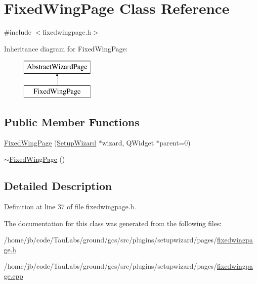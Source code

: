 \hypertarget{class_fixed_wing_page}{\section{\-Fixed\-Wing\-Page \-Class \-Reference}
\label{class_fixed_wing_page}
}


{\ttfamily \#include $<$fixedwingpage.\-h$>$}

\-Inheritance diagram for \-Fixed\-Wing\-Page\-:\begin{figure}[H]
\begin{center}
\leavevmode
\includegraphics[height=2.000000cm]{class_fixed_wing_page}
\end{center}
\end{figure}
\subsection*{\-Public \-Member \-Functions}
\begin{DoxyCompactItemize}
\item 
\hyperlink{group___fixed_wing_page_gaef301c725ba23ad6831b95d002859a1d}{\-Fixed\-Wing\-Page} (\hyperlink{class_setup_wizard}{\-Setup\-Wizard} $\ast$wizard, \-Q\-Widget $\ast$parent=0)
\item 
\hyperlink{group___fixed_wing_page_ga626dba2ab3598a1220f7ee4fae37ed5f}{$\sim$\-Fixed\-Wing\-Page} ()
\end{DoxyCompactItemize}


\subsection{\-Detailed \-Description}


\-Definition at line 37 of file fixedwingpage.\-h.



\-The documentation for this class was generated from the following files\-:\begin{DoxyCompactItemize}
\item 
/home/jb/code/\-Tau\-Labs/ground/gcs/src/plugins/setupwizard/pages/\hyperlink{fixedwingpage_8h}{fixedwingpage.\-h}\item 
/home/jb/code/\-Tau\-Labs/ground/gcs/src/plugins/setupwizard/pages/\hyperlink{fixedwingpage_8cpp}{fixedwingpage.\-cpp}\end{DoxyCompactItemize}
